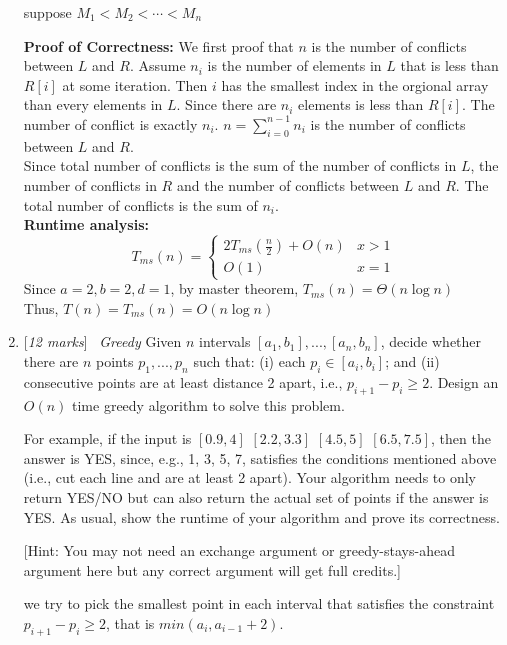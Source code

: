 \documentclass[11pt]{article}
\newcommand{\Q}[1]{\medskip\item {[{\em #1 marks\/}]}\ }
\begin{document}
\begin{enumerate}
\begin{algorithm}[h]
    \fn{} {
        suppose $M_1 < M_2 < \cdots < M_n$\\
    }
    
\end{algorithm}

\textbf{Proof of Correctness:} We first proof that $n$ is the number of conflicts between $L$ and $R$. 
Assume $n_i$ is the number of elements in $L$ that is less than $R[i]$ at some iteration. Then $i$ has the 
smallest index in the orgional array than every elements in $L$. Since there are $n_i$ elements is less than 
$R[i]$. The number of conflict is exactly $n_i$. $n = \sum_{i = 0}^{n - 1} n_i$ is the number of conflicts 
between $L$ and $R$. \\
Since total number of conflicts is the sum of the number of conflicts in $L$, the number of 
conflicts in $R$ and the number of conflicts between $L$ and $R$. The total number of conflicts is the sum of 
$n_i$.\\

\textbf{Runtime analysis:}
\[ T_{ms}(n) = \begin{cases} 
    2 T_{ms}(\frac n 2) + O(n) & x > 1 \\
    O(1) & x = 1
 \end{cases}
\]
Since $a = 2, b = 2, d = 1$, by master theorem, $T_{ms}(n) = \Theta(n \log n)$\\
Thus, $T(n) = T_{ms}(n) = O(n \log n)$

\newpage
\Q{12} {\em Greedy } Given $n$ intervals $[a_1, b_1], ..., [a_n, b_n]$, decide whether there are $n$ points $p_1, ..., p_n$ such that: (i) each $p_i \in [a_i, b_i]$; and (ii) consecutive points are at least distance 2 apart, i.e.,  $p_{i+1} - p_i \ge 2$. Design an $O(n)$ time greedy algorithm to solve this problem. 

For example, if the input is $[0.9, 4]$ $[2.2, 3.3]$ $[4.5, 5]$ $[6.5, 7.5]$, then the answer is YES, since, e.g., 1, 3, 5, 7, satisfies the conditions mentioned above (i.e., cut each line and are at least 2 apart).
Your algorithm needs to only return YES/NO but can also return the actual set of points if the answer is YES. As usual, show the runtime of your algorithm and prove its correctness.

[Hint: You may not need an exchange argument or greedy-stays-ahead argument here but any correct argument will get full credits.]

we try to pick the smallest point in each interval that satisfies the constraint $p_{i+1} - p_i \ge 2$, 
that is $min(a_i, a_{i - 1} + 2)$.


\end{enumerate}
\end{document}
